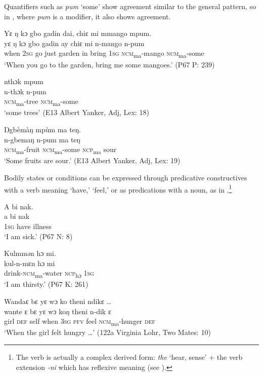Quantifiers such as \textit{pum} ‘some' show agreement similar to the general pattern, so in , where \textit{pum} is a modifier, it also shows agreement.

\ea%
    \label{ex:51}
    \ea Yɛ ŋ kɔ gbo gadin dai, chiɛ mi mmango mpum.\\
    \gll yɛ    ŋ    kɔ    gbo  gadin    ay    chiɛ  mi    n-mango        n-pum\\
    when  \textsc{2sg}  go    just  garden  in    bring  \textsc{1sg}  \textsc{ncm}\textsubscript{ma}{}-mango    \textsc{ncm}\textsubscript{ma}-some\\
    \glt ‘When you go to the garden, bring me some mangoes.' (P67 P: 239)

    \ex nthɔk mpum\\
    \gll n-thɔk    n-pum\\
    \textsc{ncm}\textsubscript{ma}{}-tree  \textsc{ncm}\textsubscript{ma}{}-some\\
    \glt ‘some trees' (E13 Albert Yanker, Adj, Lex: 18)

    \ex Ŋgbèmàŋ mpùm ma teŋ.\\
    \gll n-gbemaŋ    n-pum      ma    teŋ\\
    \textsc{ncm}\textsubscript{ma}{}-fruit    \textsc{ncm}\textsubscript{ma}{}-some  \textsc{ncp}\textsubscript{ma} sour\\
    \glt ‘Some fruits are sour.' (E13 Albert Yanker, Adj, Lex: 19)
    \z
    \z

Bodily states or conditions can be expressed through predicative constructives with a verb meaning ‘have,' ‘feel,' or as predications with a noun, as in .\footnote{The verb is actually a complex derived form: \textit{the} ‘hear, sense' + the verb extension \textit{{}-ni} which has reflexive meaning (see ).}

\ea%
    \label{ex:52}
    \ea A bi nak.\\
    \gll a    bi    nak\\
      \textsc{1sg}  have  illness\\
      \glt ‘I am sick.' (P67 N: 8)

    \ex Kulmmən hɔ mi.\\
    \gll kul-n-mɛn        hɔ      mi\\
    drink-\textsc{ncm}\textsubscript{ma}{}-water  \textsc{ncp}\textsubscript{hɔ}    \textsc{1sg}\\
    \glt ‘I am thirsty.' (P67 K: 261)

    \ex Wandaɛ bɛ yɛ wɔ ko theni ndikɛ …\\
    \gll wante    ɛ    bɛ    yɛ      wɔ    koŋ    theni    n-dik          ɛ\\
      girl    \textsc{def}  self  when    \textsc{3sg}  \textsc{pfv}    feel    \textsc{ncm}\textsubscript{ma}{}-hunger    \textsc{def}\\
    \glt ‘When the girl felt hungry …' (122a Virginia Lohr, Two Mates: 10)

